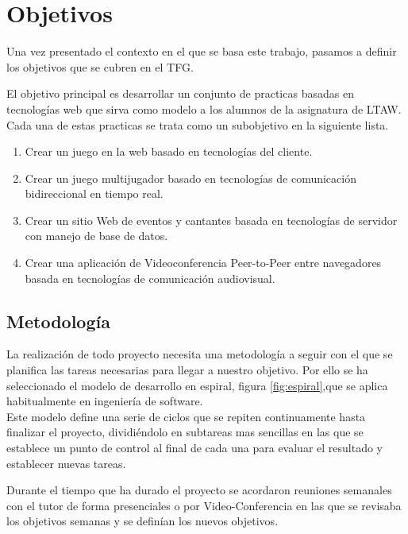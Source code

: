 \chapter{Objetivos} 
Una vez  presentado el contexto en el que se basa este trabajo, pasamos a definir los objetivos que se cubren en el TFG.

El objetivo principal es desarrollar un conjunto de practicas basadas en tecnologías web que sirva como modelo a los alumnos de la asignatura de LTAW. Cada una de estas practicas se trata como un subobjetivo en la siguiente lista.
\begin{enumerate}
\item  Crear un juego en la web basado en tecnologías del cliente.
\item Crear un juego multijugador basado en tecnologías de comunicación bidireccional en tiempo real.
\item Crear un sitio Web de eventos y cantantes basada en tecnologías de servidor con manejo de base de datos.
\item Crear una aplicación de Videoconferencia Peer-to-Peer entre navegadores basada en tecnologías de comunicación audiovisual.
\end{enumerate}
\section{Metodología}
La realización de todo proyecto necesita una metodología a seguir con el que se planifica las tareas necesarias para llegar a nuestro objetivo. Por ello se ha seleccionado el modelo de desarrollo en espiral, figura \ref{fig:espiral},que se aplica habitualmente en ingeniería de software.
\\Este modelo define una serie de ciclos que se repiten continuamente hasta finalizar el proyecto, dividiéndolo en subtareas mas sencillas en las que se establece un punto de control al final de cada una para evaluar el resultado y establecer nuevas tareas.

Durante el tiempo que ha durado el proyecto se acordaron reuniones semanales con el tutor de forma presenciales o por Video-Conferencia en las que se revisaba los objetivos semanas y se definían los nuevos objetivos.

